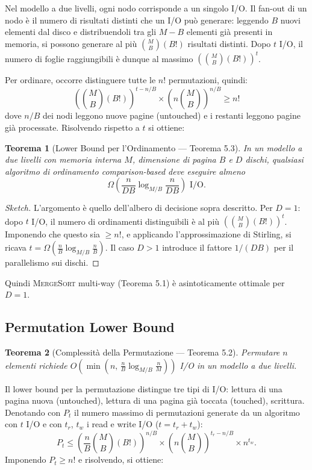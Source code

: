 \documentclass[12pt, a4paper, oneside]{book}
\theoremstyle{plain}
\newtheorem{teorema}{Teorema}[chapter]
\theoremstyle{definition}
\theoremstyle{remark}
\begin{document}
Nel modello a due livelli, ogni nodo corrisponde a un singolo I/O. Il fan-out di un nodo è il numero di risultati distinti che un I/O può generare: leggendo $B$ nuovi elementi dal disco e distribuendoli tra gli $M - B$ elementi già presenti in memoria, si possono generare al più $\binom{M}{B}(B!)$ risultati distinti. Dopo $t$ I/O, il numero di foglie raggiungibili è dunque al massimo $\left(\binom{M}{B}(B!)\right)^t$.

Per ordinare, occorre distinguere tutte le $n!$ permutazioni, quindi:
\[
\left(\binom{M}{B}(B!)\right)^{t - n/B} \times \left(n\binom{M}{B}\right)^{n/B} \ge n!
\]
dove $n/B$ dei nodi leggono nuove pagine (untouched) e i restanti leggono pagine già processate. Risolvendo rispetto a $t$ si ottiene:

\begin{teorema}[Lower Bound per l'Ordinamento --- Teorema 5.3]
In un modello a due livelli con memoria interna $M$, dimensione di pagina $B$ e $D$ dischi, qualsiasi algoritmo di ordinamento comparison-based deve eseguire almeno
\[
\Omega\!\left(\frac{n}{DB}\log_{M/B}\frac{n}{DB}\right) \text{ I/O}.
\]
\end{teorema}

\begin{proof}[Sketch]
L'argomento è quello dell'albero di decisione sopra descritto. Per $D = 1$: dopo $t$ I/O, il numero di ordinamenti distinguibili è al più $\left(\binom{M}{B}(B!)\right)^t$. Imponendo che questo sia $\ge n!$, e applicando l'approssimazione di Stirling, si ricava $t = \Omega\!\left(\frac{n}{B}\log_{M/B}\frac{n}{B}\right)$. Il caso $D > 1$ introduce il fattore $1/(DB)$ per il parallelismo sui dischi.
\end{proof}

Quindi \textsc{MergeSort} multi-way (Teorema 5.1) è asintoticamente ottimale per $D = 1$.

\subsection{Permutation Lower Bound}

\begin{teorema}[Complessità della Permutazione --- Teorema 5.2]
Permutare $n$ elementi richiede $O\!\left(\min\!\left(n,\, \frac{n}{B}\log_{M/B}\frac{n}{M}\right)\right)$ I/O in un modello a due livelli.
\end{teorema}

Il lower bound per la permutazione distingue tre tipi di I/O: lettura di una pagina nuova (untouched), lettura di una pagina già toccata (touched), scrittura. Denotando con $P_t$ il numero massimo di permutazioni generate da un algoritmo con $t$ I/O e con $t_r$, $t_w$ i read e write I/O ($t = t_r + t_w$):
\[
P_t \le \left(\frac{n}{B}\binom{M}{B}(B!)\right)^{n/B} \times \left(n\binom{M}{B}\right)^{t_r - n/B} \times n^{t_w}.
\]
Imponendo $P_t \ge n!$ e risolvendo, si ottiene:
\end{document}
